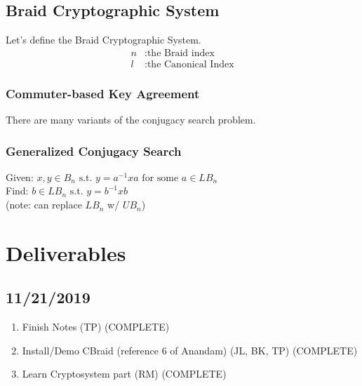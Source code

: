 \documentclass{article}
\begin{document}
	\subsection{Braid Cryptographic System}
	Let's define the Braid Cryptographic System.
	\begin{align*}
	n &: \text{the Braid index} \\
	l &: \text{the Canonical Index}
	\end{align*}
	
	\subsubsection{Commuter-based Key Agreement}
	
	There are many variants of the conjugacy search problem.
	
	\subsubsection{Generalized Conjugacy Search}
	Given: $x,y \in B_n \text{ s.t. } y=a^{-1}xa \text{ for some } a \in LB_n$ \\
	Find: $b \in LB_n \text{ s.t. } y = b^{-1}xb$ \\
	(note: can replace $LB_n$ w/ $UB_n$)
	
	\section*{Deliverables}
	\subsection*{11/21/2019}
	\begin{enumerate}
		\item Finish Notes (TP) (COMPLETE)
		\item  Install/Demo CBraid (reference 6 of Anandam) (JL, BK, TP) (COMPLETE)
		\item Learn Cryptosystem part (RM) (COMPLETE)
	\end{enumerate}


	
\end{document}
